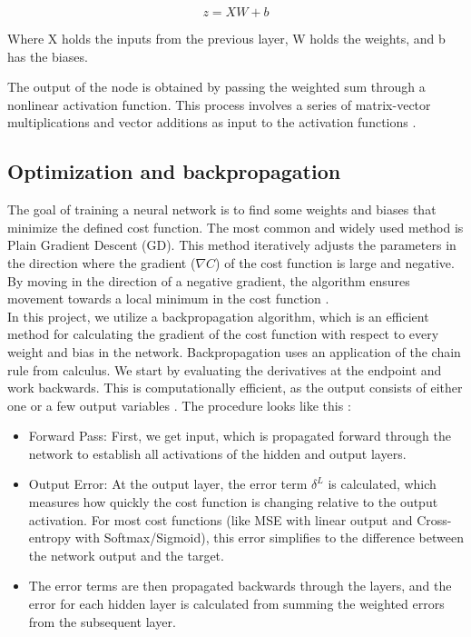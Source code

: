 \documentclass[amssymb,twocolumn,aps,floatfix]{revtex4-2}
\begin{document}
\begin{equation}
    z = XW + b
\end{equation}

Where X holds the inputs from the previous layer, W holds the weights, and b has the biases. 

The output of the node is obtained by passing the weighted sum through a nonlinear activation function. This process involves a series of matrix-vector multiplications and vector additions as input to the activation functions \cite{compfys_ch13} \cite{hj_week40}. 

\subsection{Optimization and backpropagation}

The goal of training a neural network is to find some weights and biases that minimize the defined cost function. The most common and widely used method is Plain Gradient Descent (GD). This method iteratively adjusts the parameters in the direction where the gradient ($\nabla C$) of the cost function is large and negative. By moving in the direction of a negative gradient, the algorithm ensures movement towards a local minimum in the cost function \cite{compfys_ch14}. \\

In this project, we utilize a backpropagation algorithm, which is an efficient method for calculating the gradient of the cost function with respect to every weight and bias in the network. Backpropagation uses an application of the chain rule from calculus. We start by evaluating the derivatives at the endpoint and work backwards. This is computationally efficient, as the output consists of either one or a few output variables \cite{hjorthjensen_week41_misc}. The procedure looks like this \cite[p.244]{bishop2006pattern} \cite{compfys_ch13}: 

\begin{itemize}
    \item Forward Pass: First, we get input, which is propagated forward through the network to establish all activations of the hidden and output layers. 
    \item Output Error: At the output layer, the error term $\delta^L$ is calculated, which measures how quickly the cost function is changing relative to the output activation. For most cost functions (like MSE  with linear output and Cross-entropy with Softmax/Sigmoid), this error simplifies to the difference between the network output and the target. 
    \item The error terms are then propagated backwards through the layers, and the error for each hidden layer is calculated from summing the weighted errors from the subsequent layer. 
\end{itemize}
\end{document}
